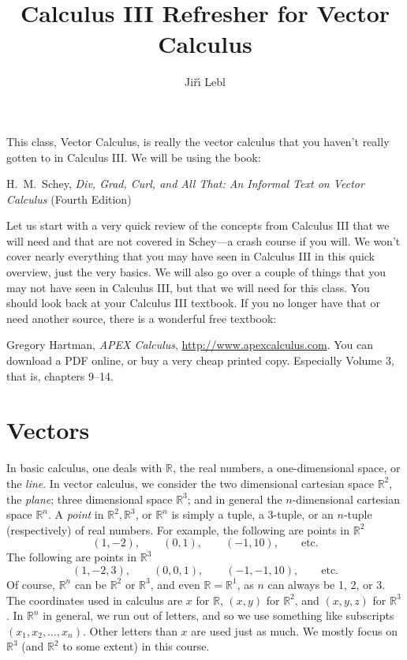 \documentclass[11pt]{article}
\newcommand{\R}{{\mathbb{R}}}
\begin{document}
\title{Calculus III Refresher for Vector Calculus}
\author{Ji\v{r}\'\i{} Lebl}

\maketitle


This class, Vector Calculus, is really the vector calculus that you haven't
really gotten to in Calculus III.
We will be using the book:

\medskip

\noindent
H.\ M.\ Schey,
\emph{Div, Grad, Curl, and All That: An Informal Text on Vector Calculus} (Fourth Edition)

\medskip

Let us start with a very quick review of the concepts
from Calculus III that we will
need and that are not covered in Schey---a crash course if you will.
We won't cover nearly everything that you may have seen in Calculus III in this quick overview,
just the very basics.  We will also go over a couple of things that you may not have seen
in Calculus III, but that we will need for this class.
You should look back at your Calculus III textbook.  If you no longer have that or need another source, there is a wonderful free textbook:

\medskip

\noindent
Gregory Hartman, \emph{APEX Calculus}, \url{http://www.apexcalculus.com}.  You can download a PDF online, or buy a very cheap printed copy.  Especially Volume 3, that is, chapters 9--14.


\section{Vectors}

In basic calculus, one deals with $\R$, the real numbers, a one-dimensional space, or the \emph{line}.
In vector calculus, we consider the two dimensional cartesian space $\R^2$,
the \emph{plane};
three dimensional space $\R^3$; and in general the $n$-dimensional cartesian space $\R^n$.
A \emph{point} in $\R^2, \R^3$, or $\R^n$ is simply a tuple,
a 3-tuple, or an $n$-tuple (respectively) of real numbers.
For example, the following are points in $\R^2$
$$
(1,-2), \qquad (0,1), \qquad (-1,10), \qquad \text{etc.}
$$
The following are points in $\R^3$
$$
(1,-2,3), \qquad (0,0,1), \qquad (-1,-1,10), \qquad \text{etc.}
$$
Of course, $\R^n$ can be $\R^2$ or $\R^3$, and even $\R = \R^1$, as $n$ can always be
1, 2, or 3.
The coordinates used in calculus are $x$ for $\R$, $(x,y)$ for $\R^2$, and $(x,y,z)$
for $\R^3$.
In $\R^n$ in general, we run out of letters, and so we use something like
subscripts $(x_1,x_2,\ldots,x_n)$.  Other letters than $x$ are used just as much.
We mostly focus on $\R^3$ (and $\R^2$ to some extent) in this course.
\end{document}
